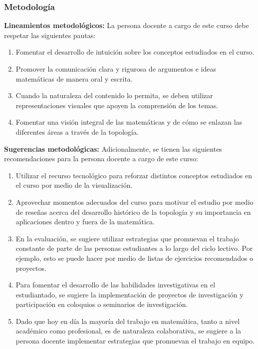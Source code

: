 \begin{refsection}
\begin{enumerate}
\end{enumerate}

\subsubsection*{Metodología}

\noindent \textbf{Lineamientos metodológicos:} La persona docente a cargo de este curso debe respetar las siguientes pautas:
\begin{enumerate}
    \item Fomentar el desarrollo de intuición sobre los conceptos estudiados en el curso.
    \item Promover la comunicación clara y rigurosa de argumentos e ideas matemáticas de manera oral y escrita.
    \item Cuando la naturaleza del contenido lo permita, se deben utilizar representaciones visuales que apoyen la comprensión de los temas.
    \item Fomentar una visión integral de las matemáticas y de cómo se enlazan las diferentes áreas a través de la topología.
\end{enumerate}

\textbf{Sugerencias metodológicas:} Adicionalmente, se tienen las siguientes recomendaciones para la persona docente a cargo de este curso:
\begin{enumerate}
    \item Utilizar el recurso tecnológico para reforzar distintos conceptos estudiados en el curso por medio de la visualización.
    \item Aprovechar momentos adecuados del curso para motivar el estudio por medio de reseñas acerca del desarrollo histórico de la topología y su importancia en aplicaciones dentro y fuera de la matemática.
    \item En la evaluación, se sugiere utilizar estrategias que promuevan el trabajo constante de parte de las personas estudiantes a lo largo del ciclo lectivo. Por ejemplo, esto se puede hacer por medio de listas de ejercicios recomendados o proyectos.
    \item Para fomentar el desarrollo de las habilidades investigativas en el estudiantado, se sugiere la implementación de proyectos de investigación y participación en coloquios o seminarios de investigación.
    \item Dado que hoy en día la mayoría del trabajo en matemática, tanto a nivel académico como profesional, es de naturaleza colaborativa, se sugiere a la persona docente implementar estrategias que promuevan el trabajo en equipo.
\end{enumerate}




\end{refsection}
